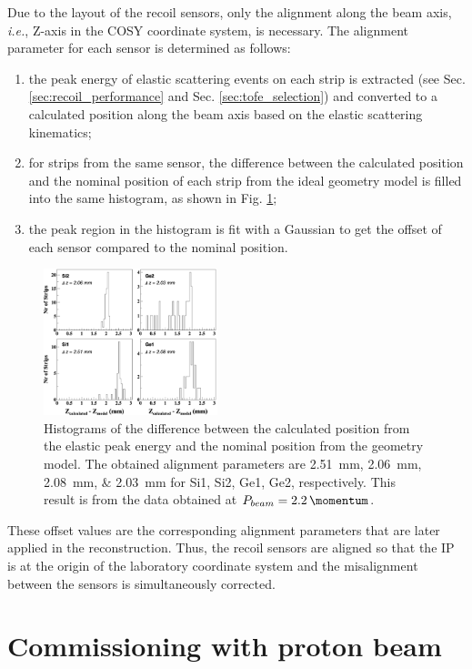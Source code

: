 \documentclass[number,5p]{elsarticle}
\begin{document}
Due to the layout of the recoil sensors, only the alignment along
the beam axis, \textit{i.e.}, Z-axis in the COSY coordinate system, is necessary.
The alignment parameter for each sensor is determined as follows:
\begin{enumerate}
\item the peak energy of elastic scattering events on each strip is extracted
  (see Sec. \ref{sec:recoil_performance} and Sec. \ref{sec:tofe_selection}) and converted to a calculated position along the beam axis based on the elastic
  scattering kinematics;
\item for strips from the same sensor, the difference between the calculated
  position and the nominal position of each strip from the ideal geometry model is filled into the same histogram, as shown in Fig. \ref{fig:alignment};
\item the peak region in the histogram is fit with a Gaussian to get the offset
  of each sensor compared to the nominal position.
\end{enumerate}
\begin{figure}[th!]
  \centering
  \includegraphics[width=0.45\textwidth]{./alignment.png}
  \caption{Histograms of the difference between the calculated position from the
    elastic peak energy and the nominal position from the geometry model.
    The obtained alignment parameters are
    \SIlist[list-units=single]{2.51;2.06;2.08;2.03}{\mm} for Si1, Si2, Ge1, Ge2, respectively.
    This result is from the data obtained at $P_{beam} =
    \SI{2.2}{\momentum}$.}
  \label{fig:alignment}
\end{figure}
These offset values are the corresponding alignment parameters that are later applied in the reconstruction.
Thus, the recoil sensors are aligned so that the IP is at the origin of the
laboratory coordinate system and the misalignment between the sensors is
simultaneously corrected.

\section{Commissioning with proton beam}
\label{sec:result}
\end{document}
